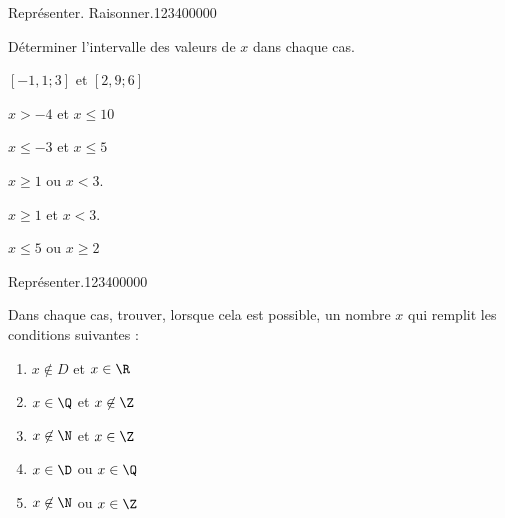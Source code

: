   
\begin{pageParcoursd} 

 

\begin{ExoCd}{Représenter. Raisonner.}{1234}{0}{0}{0}{0}{0}

Déterminer l'intervalle des valeurs de $x$ dans chaque cas.

\begin{enumerate}
\begin{minipage}{0.5\linewidth}
% 

\item $[-1,1;3]$ et $[2,9;6]$
\item $x > -4$ et $x \leq 10$
\item $x \leq -3$ et $x \leq 5$


\end{minipage}
\begin{minipage}{0.5\linewidth}
% 
\item $x \geq 1$ ou $x<3$.  
\item $x \geq 1$ et $x<3$.  
\item $x \leq 5$ ou $x \geq 2$
\end{minipage}
\end{enumerate}

\end{ExoCd}


\begin{ExoCd}{Représenter.}{1234}{0}{0}{0}{0}{0}

Dans chaque cas, trouver, lorsque cela est possible, un nombre $x$ qui remplit les conditions suivantes :
 
\begin{enumerate}[leftmargin=*]
\item $x \not\in D$ et $x \in \R$  
\item $x \in \Q$ et $x \not\in \Z$  
\item $x \not\in \N$ et $x \in \Z$  
\item $x \in \D$ ou $x \in \Q$  
\item $x \not\in \N$ ou $x \in \Z$  
\end{enumerate}
 
 \end{ExoCd}



\end{pageParcoursd}
